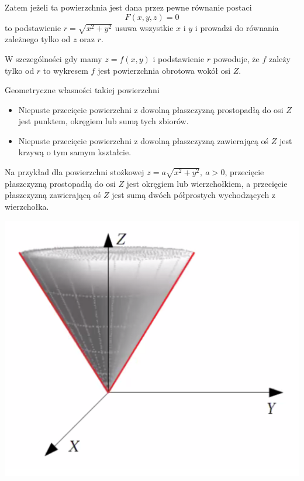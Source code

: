Zatem jeżeli ta powierzchnia jest dana przez pewne równanie postaci
$$ F(x,y,z) = 0 $$
to podstawienie $ r = \sqrt{x^2 + y^2} $ usuwa wszystkie $x$ i $y$ i prowadzi do równania zależnego tylko od $z$ oraz $r$.

W szczególności gdy mamy $z = f(x,y)$ i podstawienie $r$ powoduje, że $f$ zależy tylko od $r$ to wykresem $f$ jest powierzchnia
obrotowa wokół osi $Z$. \\

\begin{tw}{Geometryczne własności takiej powierzchni}

\begin{itemize}
    \item Niepuste przecięcie powierzchni z dowolną płaszczyzną prostopadłą do osi $Z$ jest punktem, okręgiem lub sumą tych zbiorów.
    \item Niepuste przecięcie powierzchni z dowolną płaszczyzną zawierającą oś $Z$ jest krzywą o tym samym kształcie. \\
\end{itemize}

\end{tw}

Na przykład dla powierzchni stożkowej $ z = a\sqrt{x^2 + y^2}, \ a > 0 $, przecięcie płaszczyzną prostopadłą do osi $Z$ jest okręgiem
lub wierzchołkiem, a przecięcie płaszczyzną zawierającą oś $Z$ jest sumą dwóch półprostych wychodzących z wierzchołka.

\begin{center}
\includegraphics[scale=0.6]{img/stozek_wlzm_2.png}
\end{center}

